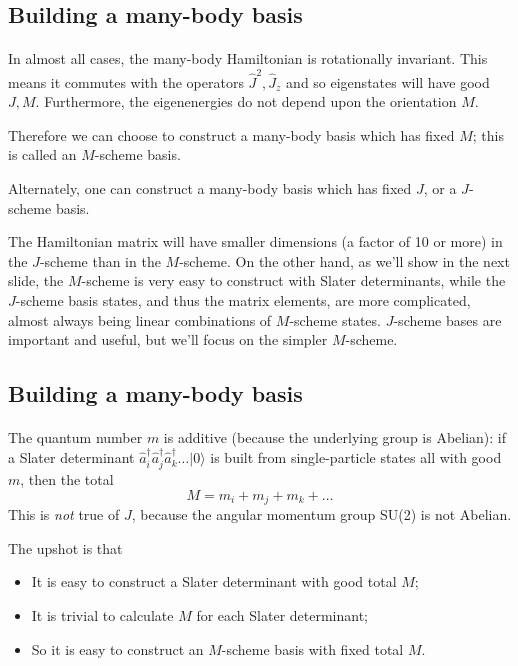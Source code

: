 \documentclass[%
twoside,                 %
final,                   %
10pt]{article}
\begin{document}
\subsection{Building a many-body basis}

\paragraph{}
In almost all cases, the many-body Hamiltonian is rotationally invariant. This means 
it commutes with the operators $\hat{J}^2, \hat{J}_z$ and so eigenstates will have 
good $J,M$. Furthermore, the eigenenergies do not depend upon the orientation $M$. 


Therefore we can choose to construct a many-body basis which has fixed $M$; this is 
called an $M$-scheme basis. 


Alternately, one can construct a many-body basis which has fixed $J$, or a $J$-scheme 
basis. 

The Hamiltonian matrix will have smaller dimensions (a factor of 10 or more)
 in the $J$-scheme than in the $M$-scheme. 
On the other hand, as we'll show in the next slide, the $M$-scheme is very easy to 
construct with Slater determinants, while the $J$-scheme basis states, and thus the 
matrix elements, are more complicated, almost always being linear combinations of 
$M$-scheme states. $J$-scheme bases are important and useful, but we'll focus on the 
simpler $M$-scheme.




\subsection{Building a many-body basis}

\paragraph{}
The quantum number $m$ is additive (because the underlying group is Abelian): 
if a Slater determinant $\hat{a}_i^\dagger \hat{a}^\dagger_j \hat{a}^\dagger_k \ldots | 0 \rangle$ 
is built from single-particle states all with good $m$, then the total 
\[
M = m_i + m_j + m_k + \ldots
\]
This is \emph{not} true of $J$, because the angular momentum group SU(2) is not Abelian.

The upshot is that 
\begin{itemize}
\item It is easy to construct a Slater determinant with good total $M$;

\item It is trivial to calculate $M$ for each Slater determinant;

\item So it is easy to construct an $M$-scheme basis with fixed total $M$.
\end{itemize}
\end{document}
